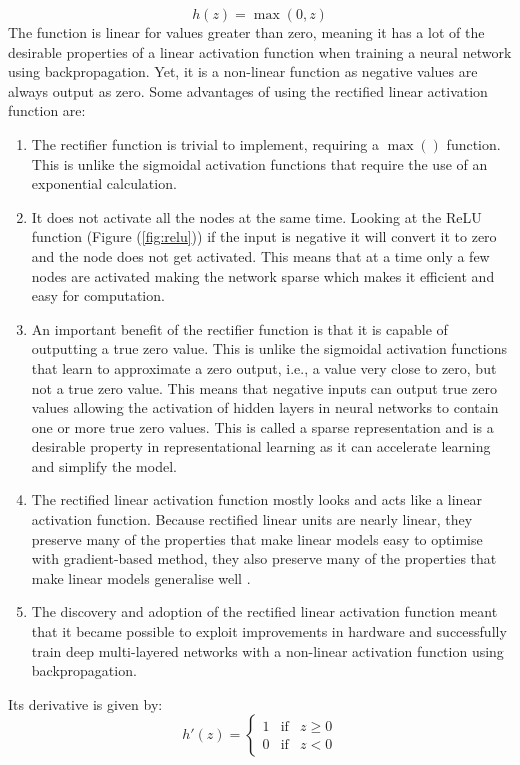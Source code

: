 \documentclass[12pt]{report}
\numberwithin{equation}{section}
\begin{document}
\begin{equation}\label{eqn:relu}
h(z) = \max(0,z)
\end{equation}
The function is linear for values greater than zero, meaning it has a lot of the desirable properties of a linear activation function when training a neural network using backpropagation. Yet, it is a non-linear function as negative values are always output as zero. Some advantages of using the rectified linear activation function are:
\begin{enumerate}[label=(\alph*)]
\item The rectifier function is trivial to implement, requiring a $\max()$ function. This is unlike the sigmoidal activation functions that require the use of an exponential calculation.
\item It does not activate all the nodes at the same time. Looking at the ReLU function (Figure (\ref{fig:relu})) if the input is negative it will convert it to zero and the node does not get activated. This means that at a time only a few nodes are activated making the network sparse which makes it efficient and easy for computation.
\item An important benefit of the rectifier function is that it is capable of outputting a true zero value. This is unlike the sigmoidal activation functions that learn to approximate a zero output, i.e., a value very close to zero, but not a true zero value. This means that negative inputs can output true zero values allowing the activation of hidden layers in neural networks to contain one or more true zero values. This is called a {sparse representation} and is a desirable property in representational learning as it can accelerate learning and simplify the model.
\item The rectified linear activation function mostly looks and acts like a linear activation function. Because rectified linear units are nearly linear, they preserve many of the properties that make linear models easy to optimise with gradient-based method, they also preserve many of the properties that make linear models generalise well {\cite{10.5555/3086952}}. 
\item The discovery and adoption of the rectified linear activation function meant that it became possible to exploit improvements in hardware and successfully train deep multi-layered networks with a non-linear activation function using backpropagation.
\end{enumerate}
Its derivative is given by:
\begin{equation}\label{eqn:relu_prime}
h'(z) = \left\{\begin{array}{lcr}
		1 & \text{if} & z \geq 0 \\
		0 & \text{if} & z < 0
		\end{array}\right.
\end{equation}
\end{document}

